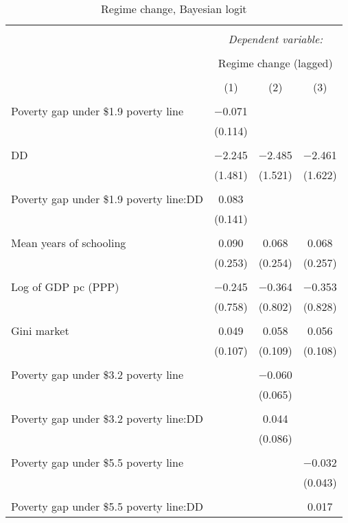 \documentclass[a4paper, 12pt]{article}
\begin{document}
	
	\begin{table}
\caption{Regime change, Bayesian logit}
\label{bayesglmrc2}
\centering
\begin{tabular}[t]{lccc}
\\[-1.8ex]\hline 
\hline \\[-1.8ex] 
 & \multicolumn{3}{c}{\textit{Dependent variable:}} \\ 
\cline{2-4} 
\\[-1.8ex] & \multicolumn{3}{c}{Regime change (lagged)} \\ 
\\[-1.8ex] & (1) & (2) & (3)\\ 
\hline \\[-1.8ex] 
Poverty gap under \$1.9 poverty line & $-$0.071 &  & \\
 & (0.114) &  & \\
 & & & \\ 
DD & $-$2.245 & $-$2.485 & $-$2.461\\
 & (1.481) & (1.521) & (1.622)\\
 & & & \\ 
Poverty gap under \$1.9 poverty line:DD & 0.083 &  & \\
 & (0.141) &  & \\
 & & & \\ 
Mean years of schooling & 0.090 & 0.068 & 0.068\\
 & (0.253) & (0.254) & (0.257)\\
 & & & \\ 
Log of GDP pc (PPP) & $-$0.245 & $-$0.364 & $-$0.353\\
 & (0.758) & (0.802) & (0.828)\\
 & & & \\ 
Gini market & 0.049 & 0.058 & 0.056\\
 & (0.107) & (0.109) & (0.108)\\
 & & & \\ 
Poverty gap under \$3.2 poverty line &  & $-$0.060 & \\
 &  & (0.065) & \\
 & & & \\ 
Poverty gap under \$3.2 poverty line:DD &  & 0.044 & \\
 &  & (0.086) & \\
 & & & \\ 
Poverty gap under \$5.5 poverty line &  &  & $-$0.032\\
 &  &  & (0.043)\\
 & & & \\ 
Poverty gap under \$5.5 poverty line:DD &  &  & 0.017\\

\end{tabular}
\end{table}
\end{document}
